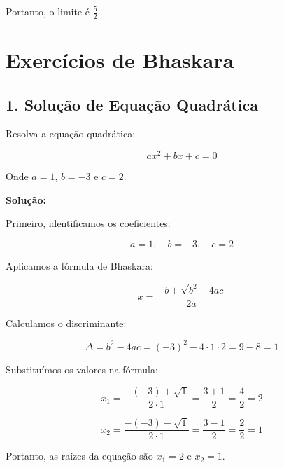 \documentclass{article}
\begin{document}
Portanto, o limite é \( \frac{5}{2} \).

\section*{Exercícios de Bhaskara}

\subsection*{1. Solução de Equação Quadrática}
Resolva a equação quadrática:

\[
ax^2 + bx + c = 0
\]

Onde \( a = 1 \), \( b = -3 \) e \( c = 2 \).

\textbf{Solução:}

Primeiro, identificamos os coeficientes:

\[
a = 1, \quad b = -3, \quad c = 2
\]

Aplicamos a fórmula de Bhaskara:

\[
x = \frac{-b \pm \sqrt{b^2 - 4ac}}{2a}
\]

Calculamos o discriminante:

\[
\Delta = b^2 - 4ac = (-3)^2 - 4 \cdot 1 \cdot 2 = 9 - 8 = 1
\]

Substituímos os valores na fórmula:

\[
x_1 = \frac{-(-3) + \sqrt{1}}{2 \cdot 1} = \frac{3 + 1}{2} = \frac{4}{2} = 2
\]

\[
x_2 = \frac{-(-3) - \sqrt{1}}{2 \cdot 1} = \frac{3 - 1}{2} = \frac{2}{2} = 1
\]

Portanto, as raízes da equação são \( x_1 = 2 \) e \( x_2 = 1 \).
\end{document}
